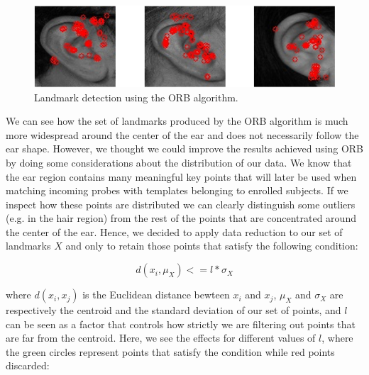 \documentclass{article}
\begin{document}
\begin{figure}[h]
    \label{fig:landmark_orb}
    \begin{center}
        \includegraphics[width=12cm,keepaspectratio]{images/landmark_orb.png}
        \caption{Landmark detection using the ORB algorithm.}
    \end{center}
\end{figure}

We can see how the set of landmarks produced by the ORB algorithm is much more widespread around the
center of the ear and does not necessarily follow the ear shape. However, we thought we could improve the
results achieved using ORB by doing some considerations about the distribution of our data. We know that the ear
region contains many meaningful key points that will later be used when matching incoming probes with templates
belonging to enrolled subjects. If we inspect how these points are distributed we can clearly distinguish some
outliers (e.g. in the hair region) from the rest of the points that are concentrated around the center of the ear.
Hence, we decided to apply data reduction to our set of landmarks $X$ and only to retain those points that
satisfy the following condition:

$$ d(x_i, \mu_X) <= l * \sigma_X $$

where $d(x_i,x_j)$ is the Euclidean distance bewteen $x_i$ and $x_j$, $\mu_X$ and $\sigma_X$ are respectively the
centroid and the standard deviation of our set of points, and $l$ can be seen as a factor that controls how strictly
we are filtering out points that are far from the centroid. Here, we see the effects for different values of $l$,
where the green circles represent points that satisfy the condition while red points discarded:
\end{document}
